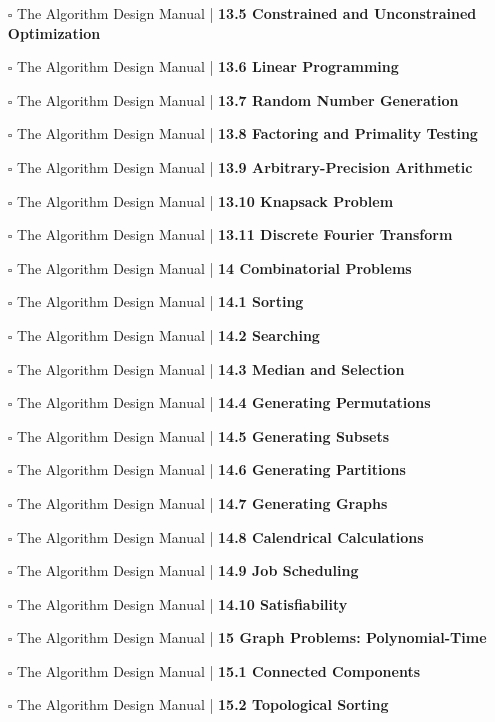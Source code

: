 \documentclass[a4, landscape, 12pt]{article}
\newcommand{\checkbox}{$\square$}%
\begin{document}
\begin{itemize}
{}
\item [\checkbox]  The Algorithm Design Manual | \textbf{ 13.5 Constrained and Unconstrained Optimization
}
\item [\checkbox]  The Algorithm Design Manual | \textbf{ 13.6 Linear Programming
}
\item [\checkbox]  The Algorithm Design Manual | \textbf{ 13.7 Random Number Generation
}
\item [\checkbox]  The Algorithm Design Manual | \textbf{ 13.8 Factoring and Primality Testing
}
\item [\checkbox]  The Algorithm Design Manual | \textbf{ 13.9 Arbitrary-Precision Arithmetic
}
\item [\checkbox]  The Algorithm Design Manual | \textbf{ 13.10 Knapsack Problem
}
\item [\checkbox]  The Algorithm Design Manual | \textbf{ 13.11 Discrete Fourier Transform
}
\item [\checkbox]  The Algorithm Design Manual | \textbf{ 14 Combinatorial Problems
}
\item [\checkbox]  The Algorithm Design Manual | \textbf{ 14.1 Sorting
}
\item [\checkbox]  The Algorithm Design Manual | \textbf{ 14.2 Searching
}
\item [\checkbox]  The Algorithm Design Manual | \textbf{ 14.3 Median and Selection
}
\item [\checkbox]  The Algorithm Design Manual | \textbf{ 14.4 Generating Permutations
}
\item [\checkbox]  The Algorithm Design Manual | \textbf{ 14.5 Generating Subsets
}
\item [\checkbox]  The Algorithm Design Manual | \textbf{ 14.6 Generating Partitions
}
\item [\checkbox]  The Algorithm Design Manual | \textbf{ 14.7 Generating Graphs
}
\item [\checkbox]  The Algorithm Design Manual | \textbf{ 14.8 Calendrical Calculations
}
\item [\checkbox]  The Algorithm Design Manual | \textbf{ 14.9 Job Scheduling
}
\item [\checkbox]  The Algorithm Design Manual | \textbf{ 14.10 Satisfiability
}
\item [\checkbox]  The Algorithm Design Manual | \textbf{ 15 Graph Problems: Polynomial-Time
}
\item [\checkbox]  The Algorithm Design Manual | \textbf{ 15.1 Connected Components
}
\item [\checkbox]  The Algorithm Design Manual | \textbf{ 15.2 Topological Sorting
}
\end{itemize}
\end{document}
